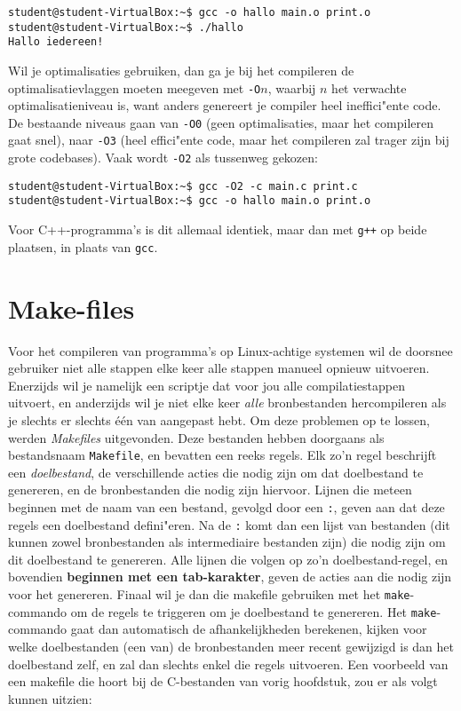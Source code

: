 \documentclass[a4paper,twoside,openany]{memoir}
\begin{document}
\begin{verbatim}
student@student-VirtualBox:~$ gcc -o hallo main.o print.o
student@student-VirtualBox:~$ ./hallo 
Hallo iedereen!
\end{verbatim}

Wil je optimalisaties gebruiken, dan ga je bij het compileren de
optimalisatievlaggen moeten meegeven met \verb!-O!$n$, waarbij $n$ het verwachte
optimalisatieniveau is, want anders genereert je compiler heel ineffici"ente
code. De bestaande niveaus gaan van \verb!-O0! (geen optimalisaties, maar het
compileren gaat snel), naar \verb!-O3! (heel effici"ente code, maar het
compileren zal trager zijn bij grote codebases). Vaak wordt \verb!-O2! als
tussenweg gekozen:
\begin{verbatim}
student@student-VirtualBox:~$ gcc -O2 -c main.c print.c 
student@student-VirtualBox:~$ gcc -o hallo main.o print.o
\end{verbatim}

Voor C++-programma's is dit allemaal identiek, maar dan met \verb!g++! op beide
plaatsen, in plaats van \verb!gcc!.

\chapter{Make-files}

Voor het compileren van programma's op Linux-achtige systemen wil de doorsnee
gebruiker niet alle stappen elke keer alle stappen manueel opnieuw uitvoeren.
Enerzijds wil je namelijk een scriptje dat voor jou alle compilatiestappen
uitvoert, en anderzijds wil je niet elke keer \emph{alle} bronbestanden
hercompileren als je slechts er slechts één van aangepast hebt. Om deze
problemen op te lossen, werden \emph{Makefiles} uitgevonden. Deze bestanden
hebben doorgaans als bestandsnaam \verb!Makefile!, en bevatten een reeks regels.
Elk zo'n regel beschrijft een \emph{doelbestand}, de verschillende acties die
nodig zijn om dat doelbestand te genereren, en de bronbestanden die nodig zijn
hiervoor. Lijnen die meteen beginnen met de naam van een bestand, gevolgd door
een \verb!:!, geven aan dat deze regels een doelbestand defini"eren. Na de
\verb!:! komt dan een lijst van bestanden (dit kunnen zowel bronbestanden als
intermediaire bestanden zijn) die nodig zijn om dit doelbestand te genereren.
Alle lijnen die volgen op zo'n doelbestand-regel, en bovendien \textbf{beginnen
met een tab-karakter}, geven de acties aan die nodig zijn voor het genereren.
Finaal wil je dan die makefile gebruiken met het \verb!make!-commando om de
regels te triggeren om je doelbestand te genereren. Het \verb!make!-commando
gaat dan automatisch de afhankelijkheden berekenen, kijken voor welke
doelbestanden (een van) de bronbestanden meer recent gewijzigd is dan het
doelbestand zelf, en zal dan slechts enkel die regels uitvoeren. Een voorbeeld
van een makefile die hoort bij de C-bestanden van vorig hoofdstuk, zou er als
volgt kunnen uitzien:
\end{document}
